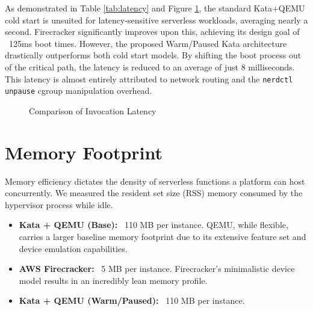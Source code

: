 \documentclass[12pt,a4paper]{report}
\begin{document}
As demonstrated in Table \ref{tab:latency} and Figure \ref{fig:latency_chart}, the standard Kata+QEMU cold start is unsuited for latency-sensitive serverless workloads, averaging nearly a second. Firecracker significantly improves upon this, achieving its design goal of ~125ms boot times.
However, the proposed Warm/Paused Kata architecture drastically outperforms both cold start models. By shifting the boot process out of the critical path, the latency is reduced to an average of just 8 milliseconds. This latency is almost entirely attributed to network routing and the \texttt{nerdctl unpause} cgroup manipulation overhead.

\begin{figure}[h]
\centering
{}
\caption{Comparison of Invocation Latency}
\label{fig:latency_chart}
\end{figure}

\section{Memory Footprint}
Memory efficiency dictates the density of serverless functions a platform can host concurrently. We measured the resident set size (RSS) memory consumed by the hypervisor process while idle.

\begin{itemize}
    \item \textbf{Kata + QEMU (Base):} ~110 MB per instance. QEMU, while flexible, carries a larger baseline memory footprint due to its extensive feature set and device emulation capabilities.
    \item \textbf{AWS Firecracker:} ~5 MB per instance. Firecracker's minimalistic device model results in an incredibly lean memory profile.
    \item \textbf{Kata + QEMU (Warm/Paused):} ~110 MB per instance.
\end{itemize}
\end{document}
